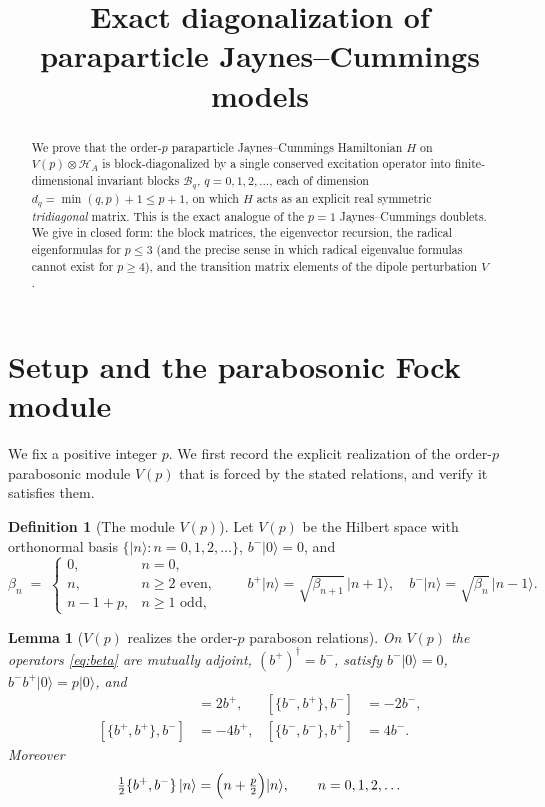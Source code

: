 \documentclass[12pt]{article}
\newtheorem{lemma}{Lemma}
\theoremstyle{definition}
\newtheorem{definition}{Definition}
\theoremstyle{remark}
\newcommand{\ket}[1]{\lvert #1\rangle}
\newcommand{\bp}{b^{+}}
\newcommand{\bm}{b^{-}}
\newcommand{\HA}{\mathcal{H}_A}
\begin{document}
\title{Exact diagonalization of paraparticle Jaynes--Cummings models}
\author{}
\date{}
\maketitle

\begin{abstract}
We prove that the order-$p$ paraparticle Jaynes--Cummings Hamiltonian $H$ on
$V(p)\otimes\HA$ is block-diagonalized by a single conserved excitation operator
into finite-dimensional invariant blocks $\mathcal{B}_q$, $q=0,1,2,\dots$, each of
dimension $d_q=\min(q,p)+1\le p+1$, on which $H$ acts as an explicit real symmetric
\emph{tridiagonal} matrix. This is the exact analogue of the $p=1$
Jaynes--Cummings doublets. We give in closed form: the block matrices, the
eigenvector recursion, the radical eigenformulas for $p\le 3$ (and the precise
sense in which radical eigenvalue formulas cannot exist for $p\ge 4$), and the
transition matrix elements of the dipole perturbation $V$.
\end{abstract}

\section{Setup and the parabosonic Fock module}\label{sec:setup}

We fix a positive integer $p$. We first record the explicit realization of the
order-$p$ parabosonic module $V(p)$ that is forced by the stated relations, and
verify it satisfies them.

\begin{definition}[The module $V(p)$]\label{def:Vp}
Let $V(p)$ be the Hilbert space with orthonormal basis $\{\ket{n}:n=0,1,2,\dots\}$,
$\bm\ket{0}=0$, and
\begin{equation}\label{eq:beta}
\beta_n \;=\; \begin{cases} 0, & n=0,\\ n, & n\ge 2 \text{ even},\\ n-1+p, & n\ge 1 \text{ odd},\end{cases}
\qquad
\bp\ket{n}=\sqrt{\beta_{n+1}}\,\ket{n+1},\quad \bm\ket{n}=\sqrt{\beta_{n}}\,\ket{n-1}.
\end{equation}
\end{definition}

\begin{lemma}[$V(p)$ realizes the order-$p$ paraboson relations]\label{lem:relations}
On $V(p)$ the operators \eqref{eq:beta} are mutually adjoint, $(\bp)^{\dagger}=\bm$,
satisfy $\bm\ket{0}=0$, $\bm\bp\ket0=p\ket0$, and
\begin{align}
[\{\bm,\bp\},\bp]&=2\bp, & [\{\bm,\bp\},\bm]&=-2\bm,\label{eq:rel1}\\
[\{\bp,\bp\},\bm]&=-4\bp, & [\{\bm,\bm\},\bp]&=4\bm.\label{eq:rel2}
\end{align}
Moreover
\begin{equation}\label{eq:numberlaw}
\tfrac12\{\bp,\bm\}\,\ket{n}=\Bigl(n+\tfrac p2\Bigr)\ket{n},\qquad n=0,1,2,\dots
\end{equation}
\end{lemma}
\end{document}
